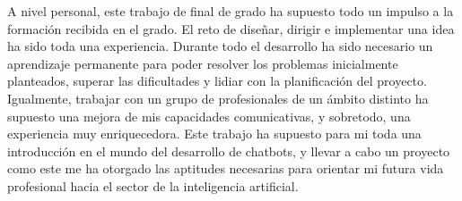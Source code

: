 A nivel personal, este trabajo de final de grado ha supuesto todo un impulso a la formación recibida en el grado. El reto de diseñar, dirigir e implementar una idea ha sido toda una experiencia. Durante todo el desarrollo ha sido necesario un aprendizaje permanente para poder resolver los problemas inicialmente planteados, superar las dificultades y lidiar con la planificación del proyecto. Igualmente, trabajar con un grupo de profesionales de un ámbito distinto ha supuesto una mejora de mis capacidades comunicativas, y sobretodo, una experiencia muy enriquecedora. Este trabajo ha supuesto para mi toda una introducción en el mundo del desarrollo de chatbots, y llevar a cabo un proyecto como este me ha otorgado las aptitudes necesarias para orientar mi futura vida profesional hacia el sector de la inteligencia artificial.\\
